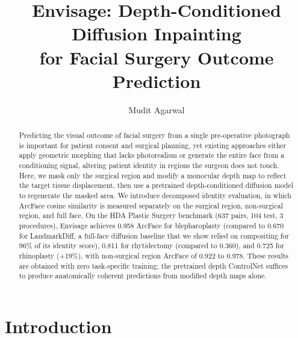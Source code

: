 \documentclass[runningheads]{llncs}
\newcommand{\method}{Envisage}
\begin{document}

\title{\method{}: Depth-Conditioned Diffusion Inpainting\\
for Facial Surgery Outcome Prediction}

\author{Mudit Agarwal}

\maketitle

\begin{abstract}
Predicting the visual outcome of facial surgery from a single
pre-operative photograph is important for patient consent and surgical
planning, yet existing approaches either apply geometric morphing
that lacks photorealism or generate the entire face from a conditioning
signal, altering patient identity in regions the surgeon does not touch.
Here, we mask only the surgical region and modify a monocular depth map
to reflect the target tissue displacement, then use a pretrained
depth-conditioned diffusion model to regenerate the masked area. We
introduce decomposed identity evaluation, in which ArcFace cosine
similarity is measured separately on the surgical region, non-surgical
region, and full face. On the HDA Plastic Surgery benchmark (637 pairs,
104 test, 3 procedures), \method{} achieves 0.958 ArcFace for blepharoplasty
(compared to 0.670 for LandmarkDiff, a full-face diffusion baseline that
we show relied on compositing for 96\% of its identity score), 0.811
for rhytidectomy (compared to 0.360), and 0.725 for rhinoplasty (+19\%),
with non-surgical region ArcFace of 0.922 to 0.978. These results are obtained with zero task-specific
training; the pretrained depth ControlNet suffices to produce
anatomically coherent predictions from modified depth maps alone.

\end{abstract}

\section{Introduction}
\label{sec:intro}
\end{document}
